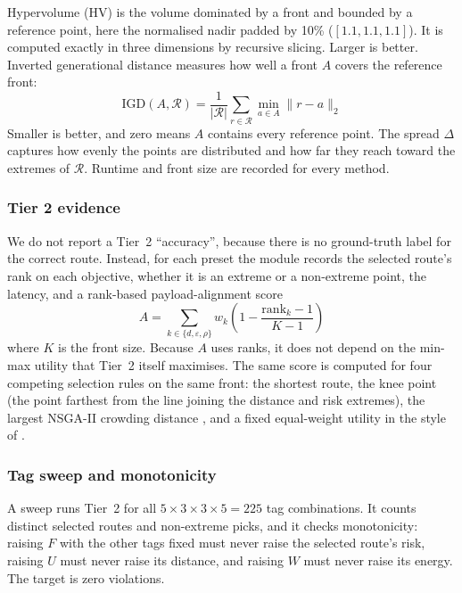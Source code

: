\documentclass{ssnreview}
\begin{document}
Hypervolume (HV) \cite{r18} is the volume dominated by a front and bounded by a
reference point, here the normalised nadir padded by 10\% ($[1.1, 1.1, 1.1]$). It is
computed exactly in three dimensions by recursive slicing. Larger is better. Inverted
generational distance measures how well a front $A$ covers the reference front:
\begin{equation}
  \mathrm{IGD}(A, \mathcal{R}) = \frac{1}{\lvert\mathcal{R}\rvert}\sum_{r \in \mathcal{R}} \min_{a \in A} \lVert r - a \rVert_2
\end{equation}
Smaller is better, and zero means $A$ contains every reference point. The spread $\Delta$
captures how evenly the points are distributed and how far they reach toward the extremes
of $\mathcal{R}$. Runtime and front size are recorded for every method.

\subsubsection{Tier 2 evidence}

We do not report a Tier~2 ``accuracy'', because there is no ground-truth label for the
correct route. Instead, for each preset the module records the selected route's rank on
each objective, whether it is an extreme or a non-extreme point, the latency, and a
rank-based payload-alignment score
\begin{equation}
  A = \sum_{k \in \{d, \varepsilon, \rho\}} w_k\left(1 - \frac{\mathrm{rank}_k - 1}{K - 1}\right)
\end{equation}
where $K$ is the front size. Because $A$ uses ranks, it does not depend on the min-max
utility that Tier~2 itself maximises. The same score is computed for four competing
selection rules on the same front: the shortest route, the knee point (the point farthest
from the line joining the distance and risk extremes), the largest NSGA-II crowding
distance \cite{r8,r3}, and a fixed equal-weight utility in the style of \cite{r1}.

\subsubsection{Tag sweep and monotonicity}

A sweep runs Tier~2 for all $5 \times 3 \times 3 \times 5 = 225$ tag combinations. It
counts distinct selected routes and non-extreme picks, and it checks monotonicity: raising
$F$ with the other tags fixed must never raise the selected route's risk, raising $U$
must never raise its distance, and raising $W$ must never raise its energy. The target is
zero violations.
\end{document}
